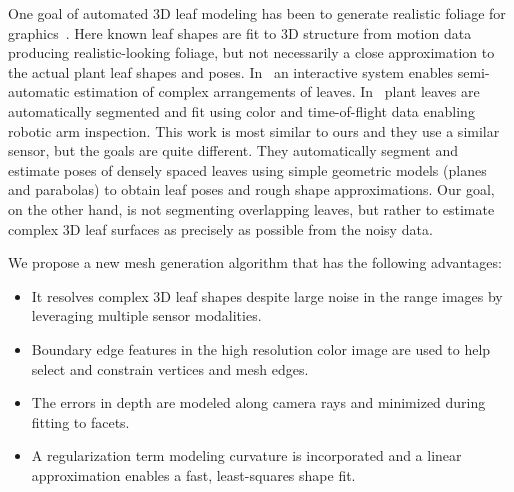 One goal of automated $3$D leaf modeling has been to generate realistic foliage for graphics~\cite{Bradley:2013}.  Here known leaf shapes are fit to $3$D structure from motion data producing realistic-looking foliage, but not necessarily a close approximation to the actual plant leaf shapes and poses.  In~\cite{Quan:2006} an interactive system enables semi-automatic estimation of complex arrangements of leaves.   In~\cite{Alenya2011,Alenya2013} plant leaves are automatically segmented and fit using color and time-of-flight data enabling robotic arm inspection.  This work is most similar to ours and they use a similar sensor, but the goals are quite different.  They automatically segment and estimate poses of densely spaced leaves using simple geometric models (planes and parabolas) to obtain leaf poses and rough shape approximations.  Our goal, on the other hand, is not segmenting overlapping leaves, but rather to estimate complex $3$D leaf surfaces as precisely as possible from the noisy data. 


We propose a new mesh generation algorithm that has the following advantages:
\begin{itemize}
\item It resolves complex $3$D leaf shapes despite large noise in the range images by leveraging multiple sensor modalities.  
\item Boundary edge features in the high resolution color image are used to help select and constrain vertices and mesh edges.  
\item The errors in depth are modeled along camera rays and minimized during fitting to facets.  
\item A regularization term modeling curvature is incorporated and a linear approximation enables a fast, least-squares shape fit.
\end{itemize}



